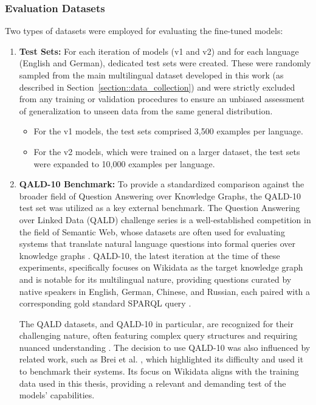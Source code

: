 \subsubsection{Evaluation Datasets}\label{sec:evaluation_datasets}

Two types of datasets were employed for evaluating the fine-tuned models:

\begin{enumerate}
    \item \textbf{Test Sets:}
    For each iteration of models (v1 and v2) and for each language (English and German), dedicated test sets were created. 
    These were randomly sampled from the main multilingual dataset developed in this work (as described in Section~\ref{section::data_collection}) and were strictly excluded from any training or validation procedures to ensure an unbiased assessment of generalization to unseen data from the same general distribution.
    \begin{itemize}
        \item For the v1 models, the test sets comprised 3,500 examples per language.
        \item For the v2 models, which were trained on a larger dataset, the test sets were expanded to 10,000 examples per language.
    \end{itemize}

    \item \textbf{QALD-10 Benchmark:}
    To provide a standardized comparison against the broader field of Question Answering over Knowledge Graphs, the QALD-10 test set \cite{usbeck2024qald} was utilized as a key external benchmark. 
    The Question Answering over Linked Data (QALD) challenge series is a well-established competition in the field of Semantic Web, whose datasets are often used for evaluating systems that translate natural language questions into formal queries over knowledge graphs \cite{brei2024leveraging}. 
    QALD-10, the latest iteration at the time of these experiments, specifically focuses on Wikidata as the target knowledge graph and is notable for its multilingual nature, providing questions curated by native speakers in English, German, Chinese, and Russian, each paired with a corresponding gold standard SPARQL query \cite{usbeck2024qald}.

    The QALD datasets, and QALD-10 in particular, are recognized for their challenging nature, often featuring complex query structures and requiring nuanced understanding \cite{usbeck2019benchmarking}. 
    The decision to use QALD-10 was also influenced by related work, such as Brei et al. \cite{brei2024leveraging}, which highlighted its difficulty and used it to benchmark their systems.
    Its focus on Wikidata aligns with the training data used in this thesis, providing a relevant and demanding test of the models' capabilities.
\end{enumerate}

